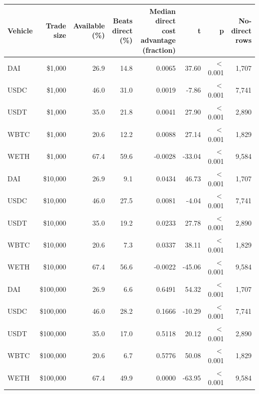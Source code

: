 \begin{tabular}{lrrrrrrr}
\toprule
Vehicle & Trade size & Available (\%) & Beats direct (\%) & Median direct cost advantage (fraction) & t & p & No-direct rows \\
\midrule
DAI & \$1,000 & 26.9 & 14.8 & 0.0065 & 37.60 & \ensuremath{<}0.001 & 1,707 \\
USDC & \$1,000 & 46.0 & 31.0 & 0.0019 & -7.86 & \ensuremath{<}0.001 & 7,741 \\
USDT & \$1,000 & 35.0 & 21.8 & 0.0041 & 27.90 & \ensuremath{<}0.001 & 2,890 \\
WBTC & \$1,000 & 20.6 & 12.2 & 0.0088 & 27.14 & \ensuremath{<}0.001 & 1,829 \\
WETH & \$1,000 & 67.4 & 59.6 & -0.0028 & -33.04 & \ensuremath{<}0.001 & 9,584 \\
DAI & \$10,000 & 26.9 & 9.1 & 0.0434 & 46.73 & \ensuremath{<}0.001 & 1,707 \\
USDC & \$10,000 & 46.0 & 27.5 & 0.0081 & -4.04 & \ensuremath{<}0.001 & 7,741 \\
USDT & \$10,000 & 35.0 & 19.2 & 0.0233 & 27.78 & \ensuremath{<}0.001 & 2,890 \\
WBTC & \$10,000 & 20.6 & 7.3 & 0.0337 & 38.11 & \ensuremath{<}0.001 & 1,829 \\
WETH & \$10,000 & 67.4 & 56.6 & -0.0022 & -45.06 & \ensuremath{<}0.001 & 9,584 \\
DAI & \$100,000 & 26.9 & 6.6 & 0.6491 & 54.32 & \ensuremath{<}0.001 & 1,707 \\
USDC & \$100,000 & 46.0 & 28.2 & 0.1666 & -10.29 & \ensuremath{<}0.001 & 7,741 \\
USDT & \$100,000 & 35.0 & 17.0 & 0.5118 & 20.12 & \ensuremath{<}0.001 & 2,890 \\
WBTC & \$100,000 & 20.6 & 6.7 & 0.5776 & 50.08 & \ensuremath{<}0.001 & 1,829 \\
WETH & \$100,000 & 67.4 & 49.9 & 0.0000 & -63.95 & \ensuremath{<}0.001 & 9,584 \\
\bottomrule
\end{tabular}
